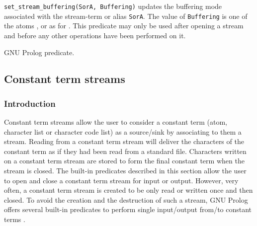 \Description

\texttt{set\_stream\_buffering(SorA, Buffering)}
updates the buffering mode associated with the stream-term or alias
\texttt{SorA}. The value of \texttt{Buffering} is one of the atoms
,  or  as for 
. This predicate may only be used after opening a stream
and before any other operations have been performed on it.

\begin{PlErrors}






\end{PlErrors}

\Portability

GNU Prolog predicate.

\subsection{Constant term streams}
\label{Constant-term-streams}

\subsubsection{Introduction}
\label{Introduction:(Constant-term-streams)}
Constant term streams allow the user to consider a constant term (atom,
character list or character code list) as a source/sink by associating to
them a stream. Reading from a constant term stream will deliver the
characters of the constant term as if they had been read from a standard
file. Characters written on a constant term stream are stored to form the
final constant term when the stream is closed. The built-in predicates
described in this section allow the user to open and close a constant term
stream for input or output. However, very often, a constant term stream is
created to be only read or written once and then closed. To avoid the
creation and the destruction of such a stream, GNU Prolog offers several
built-in predicates to perform single input/output from/to constant terms
.

